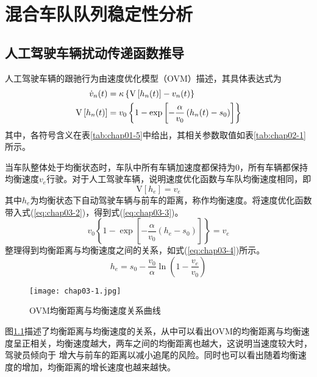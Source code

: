 
\chapter{混合车队队列稳定性分析}
\label{sec:3}

\section{人工驾驶车辆扰动传递函数推导}

人工驾驶车辆的跟驰行为由速度优化模型（OVM）描述，其具体表达式为
\begin{align}
  \dot{v}_n(t) &= \kappa \left\{ \mathrm{V} \left[ h_n(t) \right] - v_n(t) \right\} \notag \\
  \mathrm{V} \left[ h_n(t) \right] &= v_0 \left\{ 1 - \exp \left[ - \frac{\alpha}{v_0}\left(h_n(t)-s_0\right) \right] \right\}
  \label{eq:chap03-1}
\end{align}
其中，各符号含义在表\ref{tab:chap01-5}中给出，其相关参数取值如表\ref{tab:chap02-1}所示。

当车队整体处于均衡状态时，车队中所有车辆加速度都保持为0，所有车辆都保持均衡速度$v_e$行驶。对于人工驾驶车辆，说明速度优化函数与车队均衡速度相同，即
\begin{equation}
  \mathrm{V}[h_e] = v_e
  \label{eq:chap03-2}
\end{equation}
其中$h_e$为均衡状态下自动驾驶车辆与前车的距离，称作均衡速度。将速度优化函数带入式(\ref{eq:chap03-2})，得到式(\ref{eq:chap03-3})。
\begin{equation}
  v_0 \left\{ 1 - \exp \left[ -\frac{\alpha}{v_0} (h_e - s_0) \right] \right\} = v_e
  \label{eq:chap03-3}
\end{equation}
整理得到均衡距离与均衡速度之间的关系，如式(\ref{eq:chap03-4})所示。
\begin{equation}
  h_e = s_0 - \frac{v_0}{\alpha}\ln\left( 1 - \frac{v_e}{v_0} \right)
  \label{eq:chap03-4}
\end{equation}
\begin{figure}
  \centering
  \texttt{[image: chap03-1.jpg]}
  \caption{OVM均衡距离与均衡速度关系曲线}
  \label{fig:chap03-1}
\end{figure}

图\ref{fig:chap03-1}描述了均衡距离与均衡速度的关系，从中可以看出OVM的均衡距离与均衡速度呈正相关，均衡速度越大，两车之间的均衡距离也越大，这说明当速度较大时，驾驶员倾向于
增大与前车的距离以减小追尾的风险。同时也可以看出随着均衡速度的增加，均衡距离的增长速度也越来越快。

